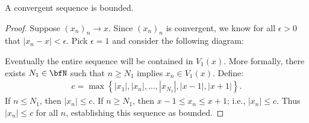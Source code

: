     \begin{proposition}
        A convergent sequence is bounded.
    \end{proposition}
        \begin{proof}
            Suppose $(x_n)_n \rightarrow x$. Since $(x_n)_n$ is convergent, we know for all $\epsilon > 0$ that $|x_n - x| < \epsilon$. Pick $\epsilon = 1$ and consider the following diagram:
                \begin{center}
                \end{center}
            Eventually the entire sequence will be contained in $V_1(x)$. More formally, there exists $N_1 \in \bfN$ such that $n \geq N_1$ implies $x_n \in V_1(x)$. Define:
                \begin{equation*}
                \begin{split}
                    c = \max \left\{|x_1|,|x_n|,...,|x_{N_1}|,|x-1|,|x+1|\right\}.
                \end{split}
                \end{equation*}
            If $n\leq N_1$, then $|x_n| \leq c$. If $n \geq N_1$, then $x-1 \leq x_n \leq x+1$; i.e., $|x_n| \leq c$. Thus $|x_n| \leq c$ for all $n$, establishing this sequence as bounded.
        \end{proof}

